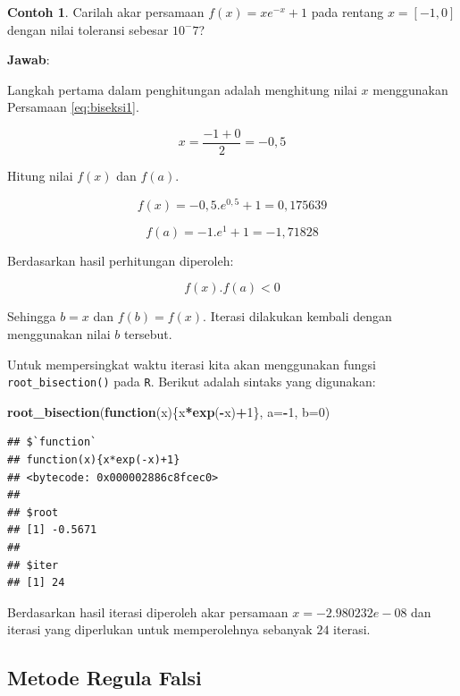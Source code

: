 \documentclass[
]{book}
\newenvironment{Shaded}{\begin{snugshade}}{\end{snugshade}}
\newcommand{\AttributeTok}[1]{\textcolor[rgb]{0.13,0.29,0.53}{#1}}
\newcommand{\ControlFlowTok}[1]{\textcolor[rgb]{0.13,0.29,0.53}{\textbf{#1}}}
\newcommand{\DecValTok}[1]{\textcolor[rgb]{0.00,0.00,0.81}{#1}}
\newcommand{\FunctionTok}[1]{\textcolor[rgb]{0.13,0.29,0.53}{\textbf{#1}}}
\newcommand{\NormalTok}[1]{#1}
\newcommand{\SpecialCharTok}[1]{\textcolor[rgb]{0.81,0.36,0.00}{\textbf{#1}}}
\theoremstyle{definition}
\theoremstyle{definition}
\newtheorem{example}{Contoh}[chapter]
\theoremstyle{definition}
\theoremstyle{definition}
\theoremstyle{remark}
\begin{document}
\begin{example}
\protect\hypertarget{exm:biseksexmp}{}\label{exm:biseksexmp}Carilah akar persamaan \(f\left(x \right)=xe^{-x}+1\) pada rentang \(x=\left[-1,0 \right]\) dengan nilai toleransi sebesar \(10^-7\)?
\end{example}

\textbf{Jawab}:

Langkah pertama dalam penghitungan adalah menghitung nilai \(x\) menggunakan Persamaan \eqref{eq:biseksi1}.

\[
x=\frac{-1+0}{2}=-0,5
\]

Hitung nilai \(f\left(x \right)\) dan \(f\left(a \right)\).

\[
f\left(x \right)=-0,5.e^{0,5}+1=0,175639
\]

\[
f\left(a \right)=-1.e^{1}+1=-1,71828
\]

Berdasarkan hasil perhitungan diperoleh:

\[
f\left(x \right).f\left(a \right)<0
\]

Sehingga \(b=x\) dan \(f\left(b \right)=f\left(x \right)\). Iterasi dilakukan kembali dengan menggunakan nilai \(b\) tersebut.

Untuk mempersingkat waktu iterasi kita akan menggunakan fungsi \texttt{root\_bisection()} pada \texttt{R}. Berikut adalah sintaks yang digunakan:

\begin{Shaded}
\begin{Highlighting}[]
\FunctionTok{root\_bisection}\NormalTok{(}\ControlFlowTok{function}\NormalTok{(x)\{x}\SpecialCharTok{*}\FunctionTok{exp}\NormalTok{(}\SpecialCharTok{{-}}\NormalTok{x)}\SpecialCharTok{+}\DecValTok{1}\NormalTok{\},}
               \AttributeTok{a=}\SpecialCharTok{{-}}\DecValTok{1}\NormalTok{, }\AttributeTok{b=}\DecValTok{0}\NormalTok{)}
\end{Highlighting}
\end{Shaded}

\begin{verbatim}
## $`function`
## function(x){x*exp(-x)+1}
## <bytecode: 0x000002886c8fcec0>
## 
## $root
## [1] -0.5671
## 
## $iter
## [1] 24
\end{verbatim}

Berdasarkan hasil iterasi diperoleh akar persamaan \(x=-2.980232e-08\) dan iterasi yang diperlukan untuk memperolehnya sebanyak \(24\) iterasi.

\hypertarget{regulafalsi}{%
\subsection{Metode Regula Falsi}\label{regulafalsi}}
\end{document}

